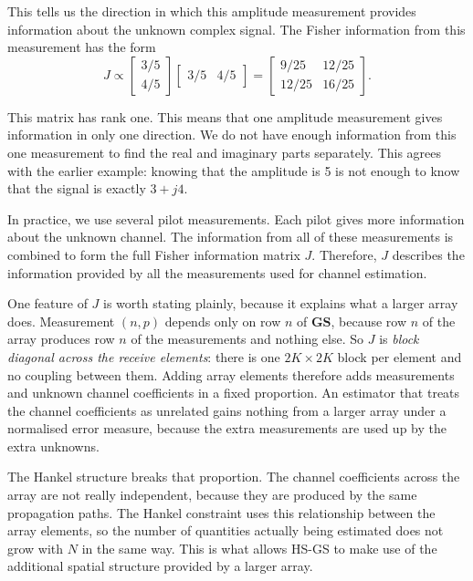 \documentclass[journal]{IEEEtran}
\newcommand{\bG}{\mathbf{G}}
\newcommand{\bS}{\mathbf{S}}
\begin{document}
This tells us the direction in which this amplitude measurement provides
information about the unknown complex signal. The Fisher information from this
measurement has the form
\begin{equation}
J\propto\begin{bmatrix}3/5\\4/5\end{bmatrix}
\begin{bmatrix}3/5&4/5\end{bmatrix}
=\begin{bmatrix}9/25&12/25\\12/25&16/25\end{bmatrix}.
\end{equation}

This matrix has rank one. This means that one amplitude measurement gives
information in only one direction. We do not have enough information from this
one measurement to find the real and imaginary parts separately. This agrees
with the earlier example: knowing that the amplitude is 5 is not enough to know
that the signal is exactly $3+j4$.

In practice, we use several pilot measurements. Each pilot gives more
information about the unknown channel. The information from all of these
measurements is combined to form the full Fisher information matrix $J$.
Therefore, $J$ describes the information provided by all the measurements used
for channel estimation.

One feature of $J$ is worth stating plainly, because it explains what a larger
array does. Measurement $(n,p)$ depends only on row $n$ of $\bG\bS$, because
row $n$ of the array
produces row $n$ of the measurements and nothing else. So $J$ is
\emph{block diagonal across the receive elements}: there is one $2K\times2K$
block per element and no coupling between them. Adding array elements therefore
adds measurements and unknown channel coefficients in a fixed proportion. An
estimator that treats the channel coefficients as unrelated gains nothing from a
larger array under a normalised error measure, because the extra measurements
are used up by the extra unknowns.

The Hankel structure breaks that proportion. The channel coefficients across the
array are not really independent, because they are produced by the same
propagation paths. The Hankel constraint uses this relationship between the
array elements, so the number of quantities actually being estimated does not
grow with $N$ in the same way. This is what allows HS-GS to make use of the
additional spatial structure provided by a larger array.
\end{document}
